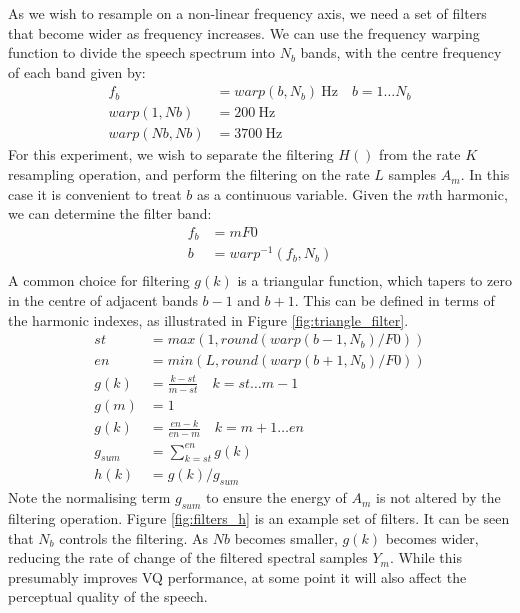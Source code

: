 \documentclass{article}
\begin{document}
As we wish to resample on a non-linear frequency axis, we need a set of filters that become wider as frequency increases. We can use the frequency warping function to divide the speech spectrum into $N_b$ bands, with the centre frequency of each band given by:
\begin{equation}
\begin{split}
f_b &= warp(b,N_b) \ \textrm{Hz} \quad b=1 \ldots N_b \\
warp(1,Nb) &= 200 \ \textrm{Hz} \\
warp(Nb,Nb) &= 3700 \ \textrm{Hz}
\end{split}
\end{equation}
For this experiment, we wish to separate the filtering $H()$ from the rate $K$ resampling operation, and perform the filtering on the rate $L$ samples $A_m$.  In this case it is convenient to treat $b$ as a continuous variable.  Given the $m$th harmonic, we can determine the filter band:
\begin{equation}
\begin{split}
f_b &= mF0 \\
b &= warp^{-1}(f_b,N_b) \\
\end{split}
\end{equation}
A common choice for filtering $g(k)$ is a triangular function, which tapers to zero in the centre of adjacent bands $b-1$ and $b+1$.  This can be defined in terms of the harmonic indexes, as illustrated in  Figure \ref{fig:triangle_filter}.
\begin{equation}
\begin{split}
st &= max(1,round(warp(b-1,N_b)/F0)) \\
en &= min(L,round(warp(b+1,N_b)/F0)) \\
g(k) &= \frac{k-st}{m-st} \quad k=st \ldots m-1 \\
g(m) &= 1 \\
g(k) &= \frac{en-k}{en-m} \quad k=m+1 \ldots en \\
g_{sum} &= \sum_{k=st}^{en}g(k) \\
h(k) &= g(k)/g_{sum}
\end{split}
\end{equation}
Note the normalising term $g_{sum}$ to ensure the energy of $A_m$ is not altered by the filtering operation. Figure \ref{fig:filters_h} is an example set of filters. It can be seen that $N_b$ controls the filtering.  As $Nb$ becomes smaller, $g(k)$ becomes wider, reducing the rate of change of the filtered spectral samples $Y_m$.  While this presumably improves VQ performance, at some point it will also affect the perceptual quality of the speech.
\end{document}
